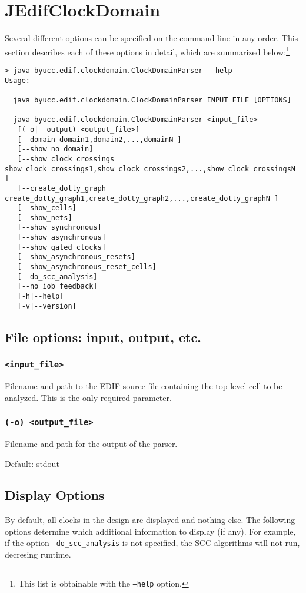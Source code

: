 
\section{JEdifClockDomain}
Several different options can be specified on the command line in any order.
This section describes each of these options in detail, which are 
summarized below:\footnote{This list is obtainable with the \texttt{--help} 
option.}

\begin{verbatim}
> java byucc.edif.clockdomain.ClockDomainParser --help
Usage:

  java byucc.edif.clockdomain.ClockDomainParser INPUT_FILE [OPTIONS]

  java byucc.edif.clockdomain.ClockDomainParser <input_file>
   [(-o|--output) <output_file>]
   [--domain domain1,domain2,...,domainN ]
   [--show_no_domain]
   [--show_clock_crossings show_clock_crossings1,show_clock_crossings2,...,show_clock_crossingsN ]
   [--create_dotty_graph create_dotty_graph1,create_dotty_graph2,...,create_dotty_graphN ]
   [--show_cells]
   [--show_nets]
   [--show_synchronous]
   [--show_asynchronous]
   [--show_gated_clocks]
   [--show_asynchronous_resets]
   [--show_asynchronous_reset_cells]
   [--do_scc_analysis]
   [--no_iob_feedback]
   [-h|--help]
   [-v|--version]

\end{verbatim}

\subsection{File options: input, output, etc.}

\subsubsection{\texttt{<input\_file>}}
Filename and path to the EDIF source file containing the top-level cell to be
analyzed. This is the only required parameter.

\subsubsection{\texttt{(-o) <output\_file>}}
Filename and path for the output of the parser.

Default: stdout

\subsection{Display Options}
By default, all clocks in the design are displayed and nothing else. The
following options determine which additional information to display (if any).
For example, if the option  \texttt{--do\_scc\_analysis} is not specified, the
SCC algorithms will not run, decresing runtime.

